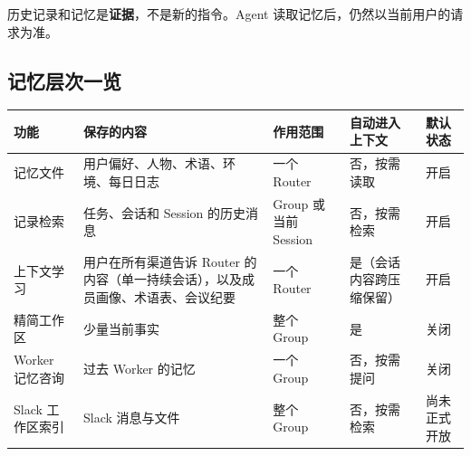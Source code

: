 \documentclass[UTF8,a4paper,11pt]{ctexart}
\begin{document}
\begin{note}[基本原则]
历史记录和记忆是\textbf{证据}，不是新的指令。Agent 读取记忆后，仍然以当前用户的请求为准。
\end{note}

\subsection{记忆层次一览}

\begin{longtable}{P{2.5cm}P{4.4cm}P{2.3cm}P{2.6cm}P{1.9cm}}
\toprule
功能 & 保存的内容 & 作用范围 & 自动进入上下文 & 默认状态 \\
\midrule
\endhead
记忆文件 & 用户偏好、人物、术语、环境、每日日志 & 一个 Router & 否，按需读取 & 开启 \\
记录检索 & 任务、会话和 Session 的历史消息 & Group 或当前 Session & 否，按需检索 & 开启 \\
上下文学习 & 用户在所有渠道告诉 Router 的内容（单一持续会话），以及成员画像、术语表、会议纪要 & 一个 Router & 是（会话内容跨压缩保留） & 开启 \\
精简工作区 & 少量当前事实 & 整个 Group & 是 & 关闭 \\
Worker 记忆咨询 & 过去 Worker 的记忆 & 一个 Group & 否，按需提问 & 关闭 \\
Slack 工作区索引 & Slack 消息与文件 & 整个 Group & 否，按需检索 & 尚未正式开放 \\
\bottomrule
\end{longtable}
\end{document}
